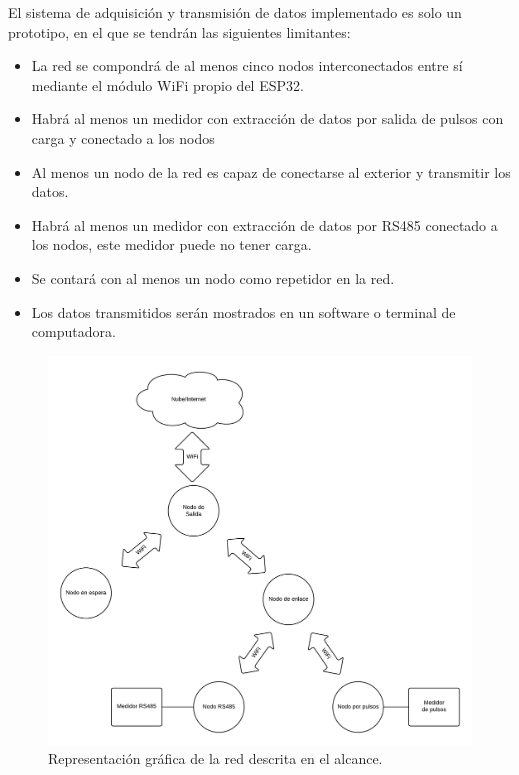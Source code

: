 \documentclass[12pt,letterpaper]{article}
\begin{document}
	El sistema de adquisición y transmisión de datos implementado es solo un prototipo, en el que se tendrán las siguientes limitantes:
		
	\begin{itemize}
	
	\item La red se compondrá de al menos cinco nodos interconectados entre sí mediante el módulo WiFi propio del ESP32.
	
	\item Habrá al menos un medidor con extracción de datos por salida de pulsos con carga y conectado a los nodos
	
	\item Al menos un nodo de la red es capaz de conectarse al exterior y transmitir los datos. 
	
	\item Habrá al menos un medidor con extracción de datos por RS485 conectado a los nodos, este medidor puede no tener carga. 
	
	\item Se contará con al menos un nodo como repetidor en la red.
	
	\item Los datos transmitidos serán mostrados en un software o terminal de computadora.
	
		
	\end{itemize}

	\begin{figure}[H]
		\centering
		\includegraphics[width=0.7\linewidth]{EsquemaTEG}
		\caption{Representación gráfica de la red descrita en el alcance.}
		\label{fig:esquemateg}
	\end{figure}
	
	
	\newpage
	
\end{document}
